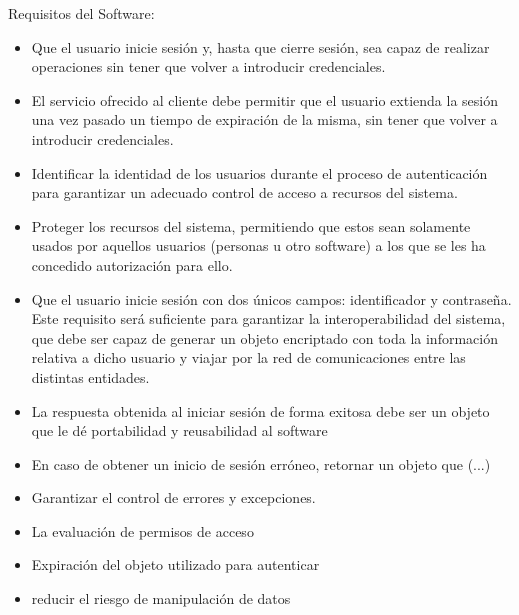 Requisitos del Software:
\begin{itemize}
	\item Que el usuario inicie sesión y, hasta que cierre sesión, sea capaz de realizar operaciones sin tener que volver a introducir credenciales. 
	\item El servicio ofrecido al cliente debe permitir que el usuario extienda la sesión una vez pasado un tiempo de expiración de la misma, sin tener que volver a introducir credenciales. 
	\item Identificar la identidad de los usuarios durante el proceso de autenticación para garantizar un adecuado control de acceso a recursos del sistema.
	\item Proteger los recursos del sistema, permitiendo que estos sean solamente usados por aquellos usuarios (personas u otro software) a los que se les ha concedido autorización para ello.
	\item Que el usuario inicie sesión con dos únicos campos: identificador y contraseña. Este requisito será suficiente para garantizar la interoperabilidad del sistema, que debe ser capaz de generar un objeto encriptado con toda la información relativa a dicho usuario y viajar por la red de comunicaciones entre las distintas entidades. 
	\item  La respuesta obtenida al iniciar sesión de forma exitosa debe ser un objeto que le dé portabilidad y reusabilidad al software
	\item En caso de obtener un inicio de sesión erróneo, retornar un objeto que (...)
	\item Garantizar el control de errores y excepciones.
	\item La evaluación de permisos de acceso
	\item Expiración del objeto utilizado para autenticar
	\item  reducir el riesgo de manipulación de datos
\end{itemize}

